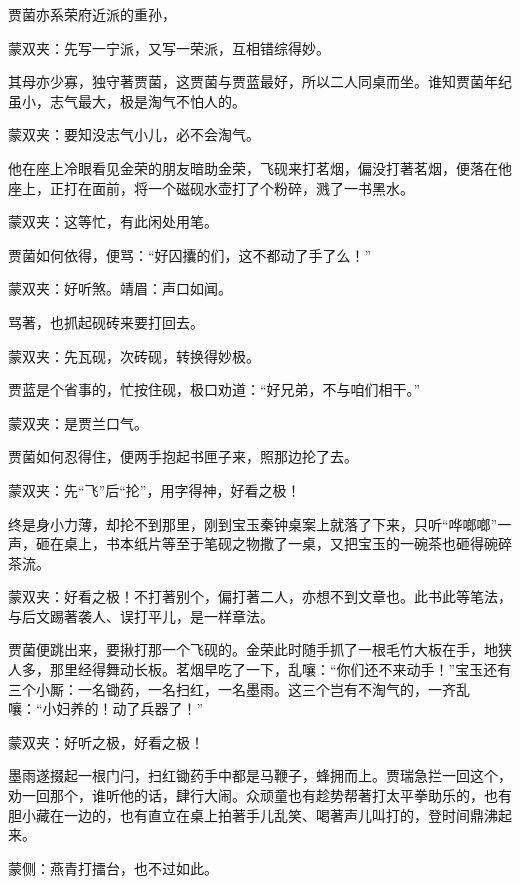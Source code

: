 \begin{parag}
    贾菌亦系荣府近派的重孙，\begin{note}蒙双夹：先写一宁派，又写一荣派，互相错综得妙。\end{note}其母亦少寡，独守著贾菌，这贾菌与贾蓝最好，所以二人同桌而坐。谁知贾菌年纪虽小，志气最大，极是淘气不怕人的。\begin{note}蒙双夹：要知没志气小儿，必不会淘气。\end{note}他在座上冷眼看见金荣的朋友暗助金荣，飞砚来打茗烟，偏没打著茗烟，便落在他座上，正打在面前，将一个磁砚水壶打了个粉碎，溅了一书黑水。\begin{note}蒙双夹：这等忙，有此闲处用笔。\end{note}贾菌如何依得，便骂：“好囚攮的们，这不都动了手了么！”\begin{note}蒙双夹：好听煞。靖眉：声口如闻。\end{note}骂著，也抓起砚砖来要打回去。\begin{note}蒙双夹：先瓦砚，次砖砚，转换得妙极。\end{note}贾蓝是个省事的，忙按住砚，极口劝道：“好兄弟，不与咱们相干。”\begin{note}蒙双夹：是贾兰口气。\end{note}贾菌如何忍得住，便两手抱起书匣子来，照那边抡了去。\begin{note}蒙双夹：先“飞”后“抡”，用字得神，好看之极！\end{note}终是身小力薄，却抡不到那里，刚到宝玉秦钟桌案上就落了下来，只听“哗啷啷”一声，砸在桌上，书本纸片等至于笔砚之物撒了一桌，又把宝玉的一碗茶也砸得碗碎茶流。\begin{note}蒙双夹：好看之极！不打著别个，偏打著二人，亦想不到文章也。此书此等笔法，与后文踢著袭人、误打平儿，是一样章法。\end{note}贾菌便跳出来，要揪打那一个飞砚的。金荣此时随手抓了一根毛竹大板在手，地狭人多，那里经得舞动长板。茗烟早吃了一下，乱嚷：“你们还不来动手！”宝玉还有三个小厮：一名锄药，一名扫红，一名墨雨。这三个岂有不淘气的，一齐乱嚷：“小妇养的！动了兵器了！”\begin{note}蒙双夹：好听之极，好看之极！\end{note}墨雨遂掇起一根门闩，扫红锄药手中都是马鞭子，蜂拥而上。贾瑞急拦一回这个，劝一回那个，谁听他的话，肆行大闹。众顽童也有趁势帮著打太平拳助乐的，也有胆小藏在一边的，也有直立在桌上拍著手儿乱笑、喝著声儿叫打的，登时间鼎沸起来。\begin{note}蒙侧：燕青打擂台，也不过如此。\end{note}
\end{parag}


